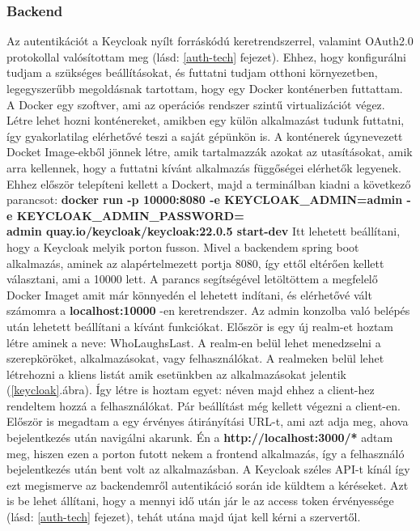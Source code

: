 \documentclass[a4paper,twoside]{article}
\begin{document}
\subsubsection{Backend}\label{auth-backend}
Az autentikációt a Keycloak nyílt forráskódú keretrendszerrel, valamint OAuth2.0 protokollal valósítottam meg (lásd: \ref{auth-tech} fejezet). Ehhez, hogy konfigurálni tudjam a 
szükséges beállításokat, és futtatni tudjam otthoni környezetben, legegyszerűbb megoldásnak tartottam, hogy egy Docker konténerben 
futtattam. A Docker egy szoftver, ami az operációs rendszer szintű virtualizációt végez. Létre lehet hozni konténereket, amikben egy külön alkalmazást tudunk futtatni, így gyakorlatilag elérhetővé teszi a saját gépünkön is. A konténerek úgynevezett Docket Image-ekből jönnek létre, amik tartalmazzák azokat az utasításokat, amik arra kellennek, hogy a futtatni kívánt alkalmazás függőségei elérhetők legyenek. Ehhez először telepíteni kellett a Dockert, majd a terminálban kiadni a következő parancsot: 
\textbf{docker run -p 10000:8080 -e KEYCLOAK\_ADMIN=admin -e KEYCLOAK\_ADMIN\_PASSWORD=\\admin quay.io/keycloak/keycloak:22.0.5 start-dev}
Itt lehetett beállítani, hogy a Keycloak melyik porton fusson. Mivel a backendem spring boot alkalmazás, aminek az alapértelmezett portja 8080, így 
ettől eltérően kellett választani, ami a 10000 lett. A parancs segítségével letöltöttem a megfelelő Docker Imaget amit már könnyedén el lehetett indítani,
és elérhetővé vált számomra a \textbf{localhost:10000} -en keretrendszer. Az admin konzolba való belépés után lehetett beállítani a kívánt funkciókat. 
Először is egy új realm-et hoztam létre aminek a neve: WhoLaughsLast. A realm-en belül lehet menedzselni a szerepköröket, alkalmazásokat, vagy felhasználókat. A realmeken belül lehet létrehozni a kliens listát amik esetünkben az alkalmazásokat jelentik (\ref{keycloak}.ábra). Így létre is hoztam egyet:  néven majd ehhez a client-hez rendeltem hozzá a felhasználókat. 
Pár beállítást még kellett végezni a client-en. Először is megadtam a egy érvényes átirányítási URL-t, ami azt adja meg, ahova bejelentkezés után navigálni akarunk. Én 
a \textbf{http://localhost:3000/*} adtam meg, hiszen ezen a porton futott nekem a frontend alkalmazás, így a felhasználó bejelentkezés után bent volt az alkalmazásban. A Keycloak
széles API-t kínál így ezt megismerve az backendemről autentikáció során ide küldtem a kéréseket. Azt is be lehet állítani, hogy a mennyi idő után jár le az access token érvényessége (lásd: \ref{auth-tech} fejezet), tehát utána majd újat kell kérni a szervertől. 
\end{document}
